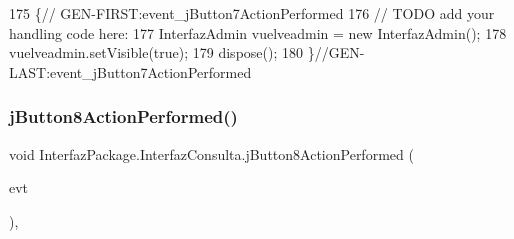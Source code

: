 \begin{DoxyCode}
175                                                                          \{\textcolor{comment}{//
      GEN-FIRST:event\_jButton7ActionPerformed}
176         \textcolor{comment}{// TODO add your handling code here:}
177         InterfazAdmin vuelveadmin = \textcolor{keyword}{new} InterfazAdmin();
178         vuelveadmin.setVisible(\textcolor{keyword}{true});
179         dispose();
180     \}\textcolor{comment}{//GEN-LAST:event\_jButton7ActionPerformed}
\end{DoxyCode}
\mbox{\label{class_interfaz_package_1_1_interfaz_consulta_a71dca5baea9a79d982001c3407d35e79}} 
\subsubsection{\texorpdfstring{j\+Button8\+Action\+Performed()}{jButton8ActionPerformed()}}
{\footnotesize\ttfamily void Interfaz\+Package.\+Interfaz\+Consulta.\+j\+Button8\+Action\+Performed (\begin{DoxyParamCaption}\item[{java.\+awt.\+event.\+Action\+Event}]{evt }\end{DoxyParamCaption})\hspace{0.3cm}{\ttfamily [inline]}, {\ttfamily [private]}}


